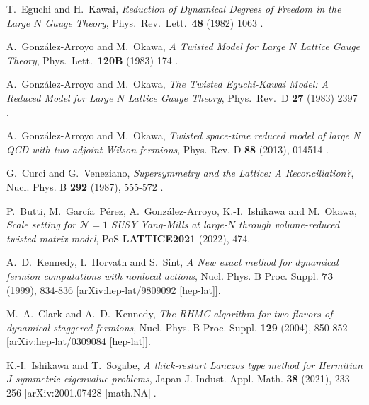 \documentclass[a4paper,11pt]{article}
\begin{document}
\begin{thebibliography}{99}

T.~Eguchi and H.~Kawai,
\textit{Reduction of Dynamical Degrees of Freedom in the Large $N$ Gauge Theory},
Phys.\ Rev.\ Lett.\  {\bf 48} (1982) 1063
.

A.~Gonz\'{a}lez-Arroyo and M.~Okawa,
\textit{A Twisted Model for Large $N$ Lattice Gauge Theory},
Phys.\ Lett.\  {\bf 120B} (1983) 174
.

A.~Gonz\'{a}lez-Arroyo and M.~Okawa,
\textit{The Twisted Eguchi-Kawai Model: A Reduced Model for Large $N$ Lattice Gauge Theory},
Phys.\ Rev.\ D {\bf 27} (1983) 2397
.

A.~Gonz\'{a}lez-Arroyo and M.~Okawa,
\textit{Twisted space-time reduced model of large N QCD with two adjoint Wilson fermions},
Phys. Rev. D \textbf{88} (2013), 014514
.

G.~Curci and G.~Veneziano,
\textit{Supersymmetry and the Lattice: A Reconciliation?},
Nucl. Phys. B \textbf{292} (1987), 555-572
.


P.~Butti, M.~Garc\'{i}a~P\'erez, A.~Gonz\'{a}lez-Arroyo, K.-I.~Ishikawa and M.~Okawa,
\textit{Scale setting for $\mathcal{N} = 1$ SUSY Yang-Mills at large-$N$ through volume-reduced twisted matrix model},
PoS \textbf{LATTICE2021} (2022), 474.

A.~D.~Kennedy, I.~Horvath and S.~Sint,
\textit{A New exact method for dynamical fermion computations with nonlocal actions},
Nucl. Phys. B Proc. Suppl. \textbf{73} (1999), 834-836
[arXiv:hep-lat/9809092 [hep-lat]].

M.~A.~Clark and A.~D.~Kennedy,
\textit{The RHMC algorithm for two flavors of dynamical staggered fermions},
Nucl. Phys. B Proc. Suppl. \textbf{129} (2004), 850-852
[arXiv:hep-lat/0309084 [hep-lat]].

K.-I.~Ishikawa and T.~Sogabe,
\textit{A thick-restart Lanczos type method for Hermitian $J$-symmetric eigenvalue problems},
Japan J. Indust. Appl. Math. \textbf{38} (2021), 233–256
[arXiv:2001.07428 [math.NA]].


\end{thebibliography}
\end{document}

